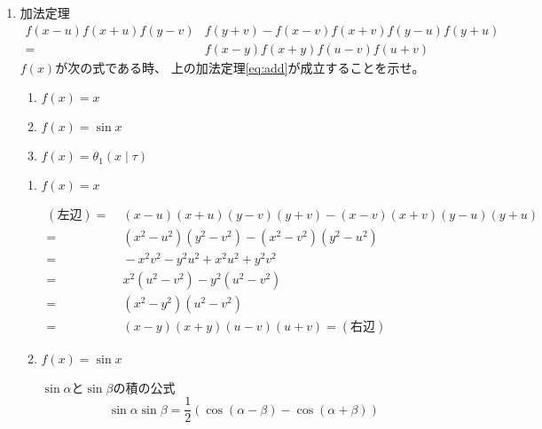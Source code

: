 \documentclass[12pt,b5paper]{ltjsarticle}
\begin{document}
\hrulefill

\begin{enumerate}
 \item 加法定理
      \begin{equation}
       \begin{split}
        f(x-u)f(x+u)f(y-v) & f(y+v)
        -f(x-v)f(x+v)f(y-u)f(y+u)\\
        =& f(x-y)f(x+y)f(u-v)f(u+v)
       \end{split}
       \label{eq:add}
      \end{equation}
      $f(x)$が次の式である時、
      上の加法定理\eqref{eq:add}が成立することを示せ。
      \begin{enumerate}
       \item $f(x)=x$
       \item $f(x)=\sin{x}$
       \item $f(x)=\theta_{1}(x \mid \tau)$
      \end{enumerate}

      \hrulefill

      \begin{enumerate}
       \item $f(x)=x$

             \dotfill

             \vspace{-30pt}
             \begin{align}
              (左辺) =&\; (x-u)(x+u)(y-v)(y+v)
              - (x-v)(x+v)(y-u)(y+u)\\
              =&\; \left(x^{2}-u^{2}\right) \left(y^{2}-v^{2}\right)
              - \left(x^{2}-v^{2}\right) \left(y^{2}-u^{2}\right)\\
              =&\; - x^{2}v^{2} - y^{2}u^{2} + x^{2}u^{2} + y^{2}v^{2}\\
              =&\; x^{2}(u^{2}-v^{2}) - y^{2}(u^{2}-v^{2})\\
              =&\; (x^{2}-y^{2})(u^{2}-v^{2})\\
              =&\; (x-y)(x+y)(u-v)(u+v) = (右辺)
             \end{align}

             \hrulefill

       \item $f(x)=\sin{x}$

             \dotfill

             $\sin{\alpha}$と$\sin{\beta}$の積の公式
             \begin{equation}
              \sin{\alpha}\sin{\beta}
               =\frac{1}{2}\left(\cos{(\alpha-\beta)}
                            -\cos{(\alpha+\beta)}\right)
             \end{equation}


\end{enumerate}
\end{enumerate}
\end{document}
